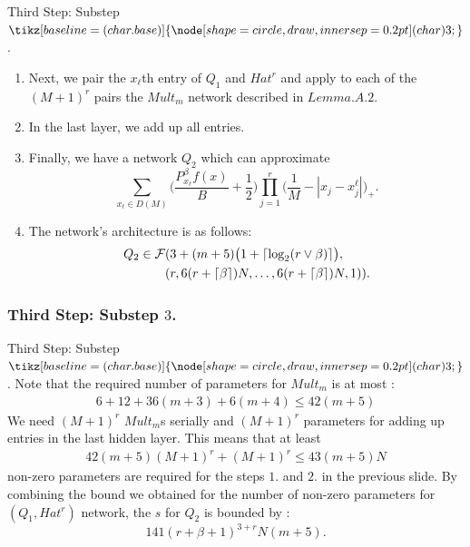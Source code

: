 \documentclass{if-beamer}
\DeclarePairedDelimiter{\ceil}{\lceil}{\rceil}
\newcommand*\circled[1]{\tikz[baseline=(char.base)]{
            \node[shape=circle,draw,inner sep=0.2pt] (char) {#1};}}
\begin{document}
\begin{frame}{Third Step: Substep $\circled{3}$.}
\begin{enumerate}
    \item Next, we pair the $x_{\ell}$th entry of $Q_{1}$ and $Hat^{r}$ and apply to each of the $(M+1)^{r}$ pairs the $Mult_m$ network described in $Lemma.A.2.$
    \item In the last layer, we add up all entries.
    \item Finally, we have a network $Q_{2}$ which can approximate
    \begin{equation*}
        \sum_{x_{\ell}\in D(M)}\bigg( \frac{P_{x_{\ell}}^{\beta}f(x)}{B}+\frac{1}{2}\bigg)\prod_{j=1}^{r}\bigg( \frac{1}{M} - |x_{j}-x_{j}^{\ell}| \bigg)_{+}.
    \end{equation*}
    \item The network's architecture is as follows:
    \begin{align*}
        Q_{2} \in \mathcal{F}&(3+(m+5) \big( 1 + \ceil{\log_{2}(r \vee \beta)} \big),\\
            &(r,6(r+\ceil{\beta})N,\dots,6(r+\ceil{\beta})N,1)).
    \end{align*}
\end{enumerate}
\end{frame}

\subsubsection{Third Step: Substep $3$.}
\begin{frame}{Third Step: Substep $\circled{3}$.}
    Note that the required number of parameters for $Mult_{m}$ is at most :
    \begin{align*}
        6+12+36(m+3)+6(m+4) \leq 42(m+5)
    \end{align*}
    We need $(M+1)^{r}$ $Mult_{m}$s serially and $(M+1)^{r}$ parameters for adding up entries in the last hidden layer.
    This means that at least 
    \begin{align*}
         42(m+5)(M+1)^{r}+(M+1)^{r} \leq 43(m+5)N
    \end{align*}
    non-zero parameters are required for the steps $1.$ and $2.$ in the previous slide.
    By combining the bound we obtained for the number of non-zero parameters for $(Q_{1},Hat^{r})$ network, the $s$ for $Q_2$ is bounded by :
    \begin{equation*}
        141(r+\beta+1)^{3+r}N(m+5).
    \end{equation*}
\end{frame}
    
\end{document}
